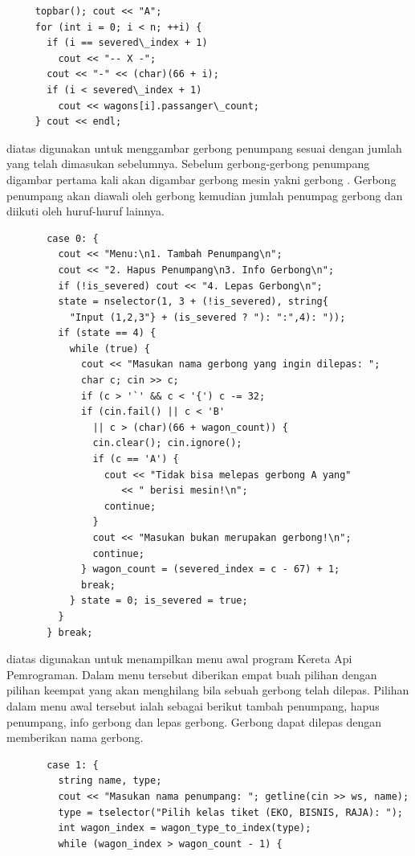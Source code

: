 \documentclass[../main.tex]{subfiles}
\begin{document}
    \newpage

\begin{lstlisting}
     topbar(); cout << "A";
     for (int i = 0; i < n; ++i) {
       if (i == severed\_index + 1)
         cout << "-- X -";
       cout << "-" << (char)(66 + i);
       if (i < severed\_index + 1)
         cout << wagons[i].passanger\_count;
     } cout << endl;
\end{lstlisting}
    \ilz{}{\Script} diatas digunakan untuk menggambar gerbong penumpang sesuai dengan jumlah yang telah dimasukan sebelumnya. Sebelum gerbong-gerbong penumpang digambar pertama kali akan digambar gerbong mesin yakni gerbong . Gerbong penumpang akan diawali oleh gerbong  kemudian jumlah penumpag gerbong dan diikuti oleh huruf-huruf lainnya.

\begin{lstlisting}
       case 0: {
         cout << "Menu:\n1. Tambah Penumpang\n";
         cout << "2. Hapus Penumpang\n3. Info Gerbong\n";
         if (!is_severed) cout << "4. Lepas Gerbong\n";
         state = nselector(1, 3 + (!is_severed), string{
           "Input (1,2,3"} + (is_severed ? "): ":",4): "));
         if (state == 4) {
           while (true) {
             cout << "Masukan nama gerbong yang ingin dilepas: ";
             char c; cin >> c;
             if (c > '`' && c < '{') c -= 32;
             if (cin.fail() || c < 'B'
               || c > (char)(66 + wagon_count)) {
               cin.clear(); cin.ignore();
               if (c == 'A') {
                 cout << "Tidak bisa melepas gerbong A yang"
                    << " berisi mesin!\n";
                 continue;
               }
               cout << "Masukan bukan merupakan gerbong!\n";
               continue;
             } wagon_count = (severed_index = c - 67) + 1;
             break;
           } state = 0; is_severed = true;
         }
       } break;
\end{lstlisting}
    \ilz{}{\Script} diatas digunakan untuk menampilkan menu awal program Kereta Api Pemrograman. Dalam menu tersebut diberikan empat buah pilihan dengan pilihan keempat yang akan menghilang bila sebuah gerbong telah dilepas. Pilihan dalam menu awal tersebut ialah sebagai berikut tambah penumpang, hapus penumpang, info gerbong dan lepas gerbong. Gerbong dapat dilepas dengan memberikan nama gerbong.
\vspace{-0.45ex}
\begin{lstlisting}
       case 1: {
         string name, type;
         cout << "Masukan nama penumpang: "; getline(cin >> ws, name);
         type = tselector("Pilih kelas tiket (EKO, BISNIS, RAJA): ");
         int wagon_index = wagon_type_to_index(type);
         while (wagon_index > wagon_count - 1) {
\end{lstlisting}
\end{document}
